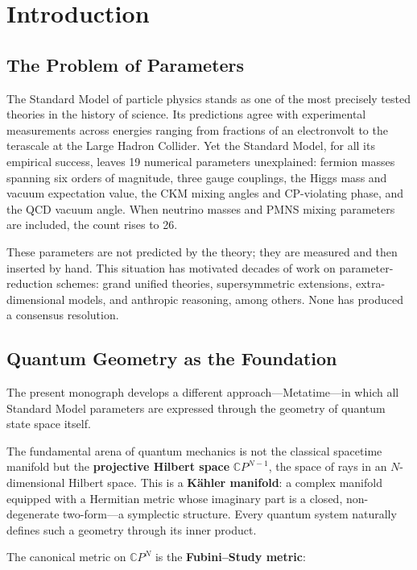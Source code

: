 \chapter{Introduction}
\label{ch:introduction}

\section{The Problem of Parameters}

The Standard Model of particle physics stands as one of the most precisely tested
theories in the history of science.  Its predictions agree with experimental
measurements across energies ranging from fractions of an electronvolt to the
terascale at the Large Hadron Collider.  Yet the Standard Model, for all its
empirical success, leaves 19 numerical parameters unexplained: fermion masses
spanning six orders of magnitude, three gauge couplings, the Higgs mass and
vacuum expectation value, the CKM mixing angles and CP-violating phase, and
the QCD vacuum angle.  When neutrino masses and PMNS mixing parameters are
included, the count rises to 26.

These parameters are not predicted by the theory; they are measured and then
inserted by hand.  This situation has motivated decades of work on
parameter-reduction schemes: grand unified theories, supersymmetric extensions,
extra-dimensional models, and anthropic reasoning, among others.  None has
produced a consensus resolution.

\section{Quantum Geometry as the Foundation}

The present monograph develops a different approach---Metatime---in which
all Standard Model parameters are expressed through the geometry of quantum
state space itself.

The fundamental arena of quantum mechanics is not the classical spacetime
manifold but the \textbf{projective Hilbert space} \(\mathbb{C}P^{N-1}\),
the space of rays in an \(N\)-dimensional Hilbert space.  This is a
\textbf{K\"{a}hler manifold}: a complex manifold equipped with a
Hermitian metric whose imaginary part is a closed, non-degenerate
two-form---a symplectic structure.  Every quantum system naturally defines
such a geometry through its inner product.

The canonical metric on \(\mathbb{C}P^{N}\) is the
\textbf{Fubini--Study metric}:

